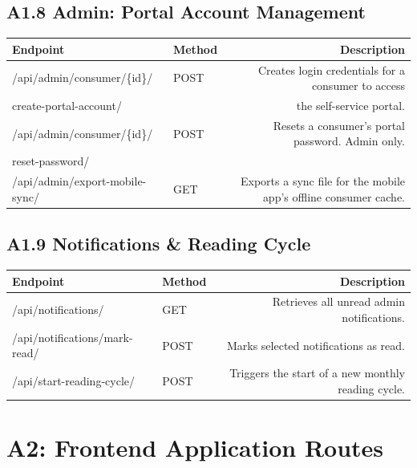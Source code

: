 \documentclass[12pt, a4paper, onecolumn]{report}
\begin{document}
\vspace{0.8em}
\subsection*{A1.8 Admin: Portal Account Management}
\renewcommand{\arraystretch}{1.6}
\begin{tabularx}{\textwidth}{|E|M|D|}
\hline
\textbf{Endpoint} & \textbf{Method} & \textbf{Description} \\
\hline
/api/admin/consumer/\{id\}/ & POST & Creates login credentials for a consumer to access\\
create-portal-account/ &  & the self-service portal. \\
\hline
/api/admin/consumer/\{id\}/ & POST & Resets a consumer's portal password. Admin only. \\
reset-password/ &  &  \\
\hline
/api/admin/export-mobile-sync/ & GET & Exports a sync file for the mobile app's offline consumer cache. \\
\hline
\end{tabularx}
\renewcommand{\arraystretch}{1}

\vspace{0.8em}
\subsection*{A1.9 Notifications \& Reading Cycle}
\renewcommand{\arraystretch}{1.6}
\begin{tabularx}{\textwidth}{|E|M|D|}
\hline
\textbf{Endpoint} & \textbf{Method} & \textbf{Description} \\
\hline
/api/notifications/ & GET & Retrieves all unread admin notifications. \\
\hline
/api/notifications/mark-read/ & POST & Marks selected notifications as read. \\
\hline
/api/start-reading-cycle/ & POST & Triggers the start of a new monthly reading cycle. \\
\hline
\end{tabularx}
\renewcommand{\arraystretch}{1}

\newpage
\section*{A2: Frontend Application Routes}
\end{document}
